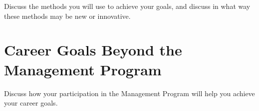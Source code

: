 \documentclass[final,letterpaper,oneside,12pt]{article}
\begin{document}
Discuss the methods you will use to achieve your goals, and discuss in what way these methods may be new or innovative.


\section{Career Goals Beyond the Management Program}

Discuss how your participation in the Management Program will help you achieve your career goals.


\newpage
\singlespacing
\setlength{\bibsep}{0ex}


\end{document}
